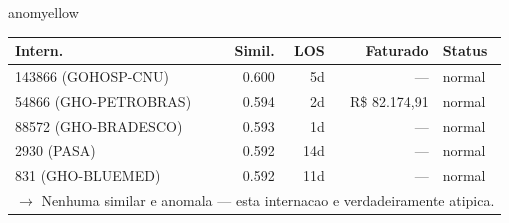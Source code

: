 \documentclass[a4paper,10pt]{article}
\begin{document}
\begin{anomalycard}[Internacao 164536 | GHO-PETROBRAS | MODERADO (z=2.62)]{anomyellow}
\begin{tabular}{l r r r l}\toprule\textbf{Intern.} & \textbf{Simil.} & \textbf{LOS} & \textbf{Faturado} & \textbf{Status} \\\midrule
143866 (GOHOSP-CNU) & 0.600 & 5d & --- & \textcolor{jcubeblue}{normal} \\
54866 (GHO-PETROBRAS) & 0.594 & 2d & R\$ 82.174,91 & \textcolor{jcubeblue}{normal} \\
88572 (GHO-BRADESCO) & 0.593 & 1d & --- & \textcolor{jcubeblue}{normal} \\
2930 (PASA) & 0.592 & 14d & --- & \textcolor{jcubeblue}{normal} \\
831 (GHO-BLUEMED) & 0.592 & 11d & --- & \textcolor{jcubeblue}{normal} \\
\multicolumn{5}{l}{\textcolor{jcubeblue}{\small $\rightarrow$ Nenhuma similar e anomala --- esta internacao e verdadeiramente atipica.}} \\
\bottomrule\end{tabular}


\end{anomalycard}

\newpage
\end{document}
